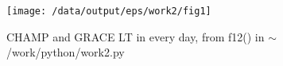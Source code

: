\documentclass[12pt,a4paper]{article}
\begin{document}
\begin{figure}[!ht]
    \begin{center}
        \texttt{[image: /data/output/eps/work2/fig1]}
        \caption{CHAMP and GRACE LT in every day, from f12() in $\sim$/work/python/work2.py}
    \end{center}
    \label{fig1}
\end{figure}
\end{document}
